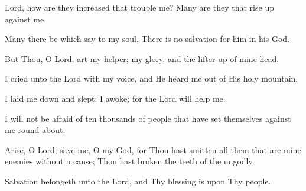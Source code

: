 Lord, how are they increased that trouble me? Many are they that rise up against me.

Many there be which say to my soul, There is no salvation for him in his God.

But Thou, O Lord, art my helper; my glory, and the lifter up of mine head.

I cried unto the Lord with my voice, and He heard me out of His holy mountain.

I laid me down and slept; I awoke; for the Lord will help me.

I will not be afraid of ten thousands of people that have set themselves against me round about.

Arise, O Lord, save me, O my God, for Thou hast smitten all them that are mine enemies without a cause; Thou hast broken the teeth of the ungodly.

Salvation belongeth unto the Lord, and Thy blessing is upon Thy people.

